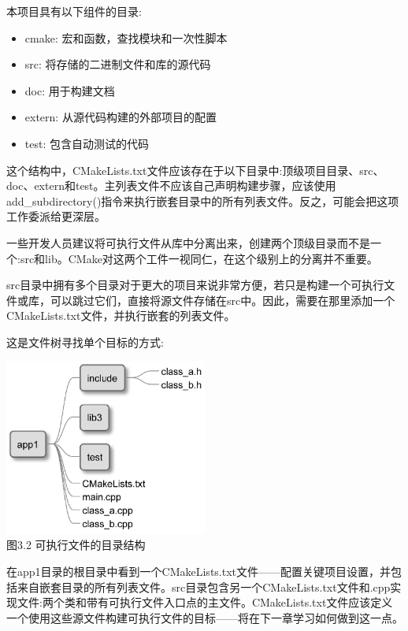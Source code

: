 本项目具有以下组件的目录:

\begin{itemize}
\item 
cmake: 宏和函数，查找模块和一次性脚本

\item 
src: 将存储的二进制文件和库的源代码

\item 
doc: 用于构建文档

\item 
extern: 从源代码构建的外部项目的配置

\item 
test: 包含自动测试的代码
\end{itemize}

这个结构中，CMakeLists.txt文件应该存在于以下目录中:顶级项目目录、src、doc、extern和test。主列表文件不应该自己声明构建步骤，应该使用add\_subdirectory()指令来执行嵌套目录中的所有列表文件。反之，可能会把这项工作委派给更深层。

\begin{tcolorbox}[colback=blue!5!white,colframe=blue!75!black,title=Note]
一些开发人员建议将可执行文件从库中分离出来，创建两个顶级目录而不是一个:src和lib。CMake对这两个工件一视同仁，在这个级别上的分离并不重要。
\end{tcolorbox}

src目录中拥有多个目录对于更大的项目来说非常方便，若只是构建一个可执行文件或库，可以跳过它们，直接将源文件存储在src中。因此，需要在那里添加一个CMakeLists.txt文件，并执行嵌套的列表文件。

这是文件树寻找单个目标的方式:

\begin{center}
\includegraphics[width=0.5\textwidth]{content/1/chapter3/images/2.jpg}\\
图3.2 可执行文件的目录结构
\end{center}

在app1目录的根目录中看到一个CMakeLists.txt文件——配置关键项目设置，并包括来自嵌套目录的所有列表文件。src目录包含另一个CMakeLists.txt文件和.cpp实现文件:两个类和带有可执行文件入口点的主文件。CMakeLists.txt文件应该定义一个使用这些源文件构建可执行文件的目标——将在下一章学习如何做到这一点。

